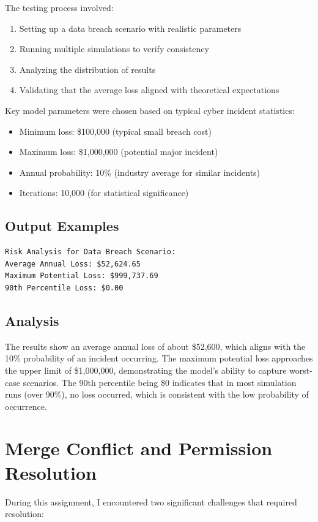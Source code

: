 The testing process involved:
\begin{enumerate}
    \item Setting up a data breach scenario with realistic parameters
    \item Running multiple simulations to verify consistency
    \item Analyzing the distribution of results
    \item Validating that the average loss aligned with theoretical expectations
\end{enumerate}

Key model parameters were chosen based on typical cyber incident statistics:
\begin{itemize}
    \item Minimum loss: \$100,000 (typical small breach cost)
    \item Maximum loss: \$1,000,000 (potential major incident)
    \item Annual probability: 10\% (industry average for similar incidents)
    \item Iterations: 10,000 (for statistical significance)
\end{itemize}

\subsection{Output Examples}
\begin{verbatim}
Risk Analysis for Data Breach Scenario:
Average Annual Loss: $52,624.65
Maximum Potential Loss: $999,737.69
90th Percentile Loss: $0.00
\end{verbatim}

\subsection{Analysis}
The results show an average annual loss of about \$52,600, which aligns with the 
10\% probability of an incident occurring. The maximum potential loss approaches 
the upper limit of \$1,000,000, demonstrating the model's ability to capture 
worst-case scenarios. The 90th percentile being \$0 indicates that in most 
simulation runs (over 90\%), no loss occurred, which is consistent with the 
low probability of occurrence.

\section{Merge Conflict and Permission Resolution}
During this assignment, I encountered two significant challenges that required resolution:

